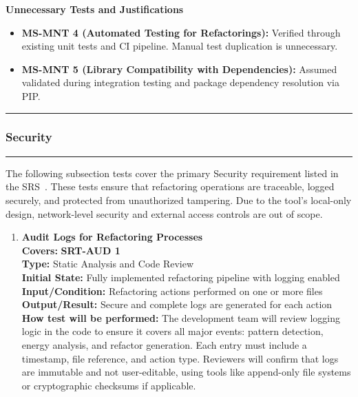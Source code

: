\documentclass[12pt, titlepage]{article}
\newcommand{\colorrule}{\textcolor{BlueViolet}{\rule{\linewidth}{2pt}}}
\begin{document}
\vspace{2mm}
\noindent\textbf{Unnecessary Tests and Justifications}
\begin{itemize}
  \item \textbf{MS-MNT 4 (Automated Testing for Refactorings):} Verified through existing unit tests and CI pipeline. Manual test duplication is unnecessary.
  \item \textbf{MS-MNT 5 (Library Compatibility with Dependencies):} Assumed validated during integration testing and package dependency resolution via PIP.
\end{itemize}

\noindent  \colorrule


\subsubsection{Security}
\colorrule

\medskip

\noindent
The following subsection tests cover the primary Security requirement listed in the SRS~\cite{SRS}. These tests ensure that refactoring operations are traceable, logged securely, and protected from unauthorized tampering. Due to the tool's local-only design, network-level security and external access controls are out of scope.

\begin{enumerate}[label={\bf \textcolor{Maroon}{test-SRT-\arabic*}}, wide=0pt, font=\itshape]

  \item \textbf{Audit Logs for Refactoring Processes} \\[2mm]
    \textbf{Covers:} \textbf{SRT-AUD 1} \\ 
    \textbf{Type:} Static Analysis and Code Review \\
    \textbf{Initial State:} Fully implemented refactoring pipeline with logging enabled \\
    \textbf{Input/Condition:} Refactoring actions performed on one or more files \\
    \textbf{Output/Result:} Secure and complete logs are generated for each action \\[2mm]
    \textbf{How test will be performed:} The development team will review logging logic in the code to ensure it covers all major events: pattern detection, energy analysis, and refactor generation. Each entry must include a timestamp, file reference, and action type. Reviewers will confirm that logs are immutable and not user-editable, using tools like append-only file systems or cryptographic checksums if applicable.

\end{enumerate}
\end{document}
